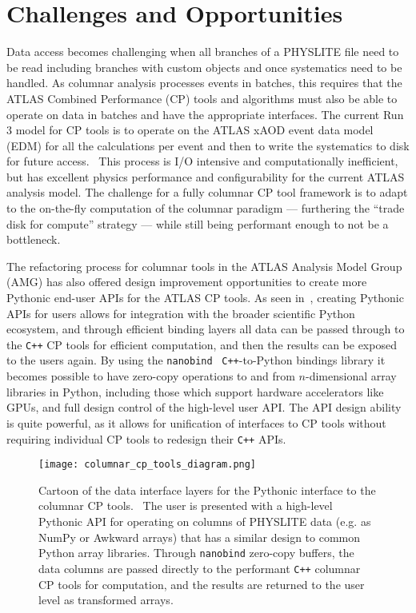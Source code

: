 \section{Challenges and Opportunities}\label{sec:challenges}

Data access becomes challenging when all branches of a PHYSLITE file need to be read including branches with custom objects and once systematics need to be handled.
As columnar analysis processes events in batches, this requires that the ATLAS Combined Performance (CP) tools and algorithms must also be able to operate on data in batches and have the appropriate interfaces.
The current Run 3 model for CP tools is to operate on the ATLAS xAOD event data model (EDM) for all the calculations per event and then to write the systematics to disk for future access.~\cite{SOFT-2022-02}
This process is I/O intensive and computationally inefficient, but has excellent physics performance and configurability for the current ATLAS analysis model.
The challenge for a fully columnar CP tool framework is to adapt to the on-the-fly computation of the columnar paradigm --- furthering the ``trade disk for compute'' strategy --- while still being performant enough to not be a bottleneck.

The refactoring process for columnar tools in the ATLAS Analysis Model Group (AMG) has also offered design improvement opportunities to create more Pythonic end-user APIs for the ATLAS CP tools.
As seen in~, creating Pythonic APIs for users allows for integration with the broader scientific Python ecosystem, and through efficient binding layers all data can be passed through to the \texttt{C++} CP tools for efficient computation, and then the results can be exposed to the users again.
By using the \texttt{nanobind}~\cite{nanobind} \texttt{C++}-to-Python bindings library it becomes possible to have zero-copy operations to and from $n$-dimensional array libraries in Python, including those which support hardware accelerators like GPUs, and full design control of the high-level user API.
The API design ability is quite powerful, as it allows for unification of interfaces to CP tools without requiring individual CP tools to redesign their \texttt{C++} APIs.

\begin{figure}
    \centering
    \texttt{[image: columnar\_cp\_tools\_diagram.png]}
    \caption{Cartoon of the data interface layers for the Pythonic interface to the columnar CP tools.~\cite{Vigl:ACAT_2024}
The user is presented with a high-level Pythonic API for operating on columns of PHYSLITE data (e.g. as NumPy or Awkward arrays) that has a similar design to common Python array libraries.
Through \texttt{nanobind} zero-copy buffers, the data columns are passed directly to the performant \texttt{C++} columnar CP tools for computation, and the results are returned to the user level as transformed arrays.}
    \label{fig:columnar_cp_tools_diagram}
\end{figure}

